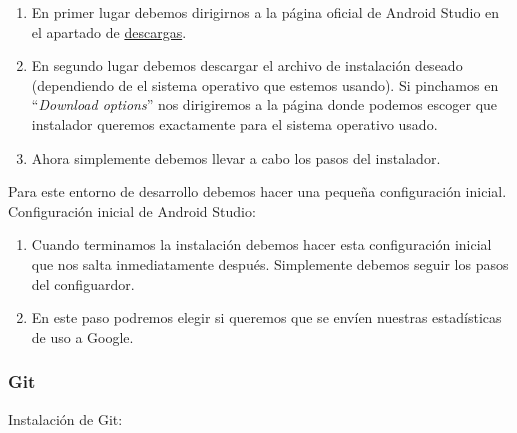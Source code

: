 \begin{enumerate}
\item
	En primer lugar debemos dirigirnos a la página oficial de Android Studio en el apartado de \href{https://developer.android.com/studio?hl=es}{descargas}.
\item
	En segundo lugar debemos descargar el archivo de instalación deseado (dependiendo de el sistema operativo que estemos usando).
	Si pinchamos en ``\textit{Download options}'' nos dirigiremos a la página donde podemos escoger que instalador queremos exactamente para el sistema operativo usado.
\item 
	Ahora simplemente debemos llevar a cabo los pasos del instalador.
\end{enumerate}

Para este entorno de desarrollo debemos hacer una pequeña configuración inicial.
Configuración inicial de Android Studio:
\begin{enumerate}
\item
	Cuando terminamos la instalación debemos hacer esta configuración inicial que nos salta inmediatamente después.
	Simplemente debemos seguir los pasos del configuardor.
\item
	En este paso podremos elegir si queremos que se envíen nuestras estadísticas de uso a Google.

\end{enumerate}

\subsubsection{Git}

Instalación de Git:

